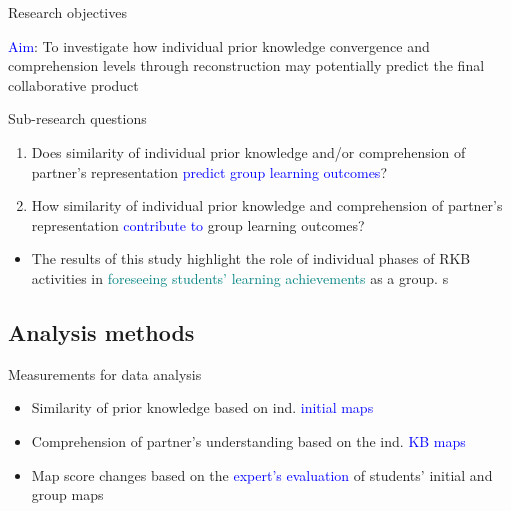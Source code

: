 \begin{frame}{Research objectives}

\textcolor<1>{blue}{Aim}: To investigate how individual prior knowledge convergence and comprehension levels through reconstruction may potentially predict the final collaborative product

\begin{block}{Sub-research questions}
    \begin{enumerate}
        \item <+-> Does similarity of individual prior knowledge and/or comprehension 
              of partner's representation \textcolor{blue}{predict group learning outcomes}?
        \item <+-> How similarity of individual prior knowledge and comprehension
              of partner's representation \textcolor{blue}{contribute to} group learning outcomes?
    \end{enumerate}
\end{block}

\begin{itemize}
    \item <+->{\small The results of this study highlight the role of individual phases of RKB activities in \textcolor{teal}{foreseeing students’ learning achievements} as a group.}
s
\end{itemize}
    
\end{frame}



\subsection{Analysis methods}
\begin{frame}{Measurements for data analysis}
    \begin{itemize}
        \item <1-> Similarity of prior knowledge based on ind. \textcolor{blue}{initial maps}
        \item <1-> Comprehension of partner's understanding based on the ind. \textcolor{blue}{KB maps}
        \item <2> Map score changes based on the \textcolor{blue}{expert's evaluation} of students' initial and group maps
    \end{itemize}
\end{frame}

